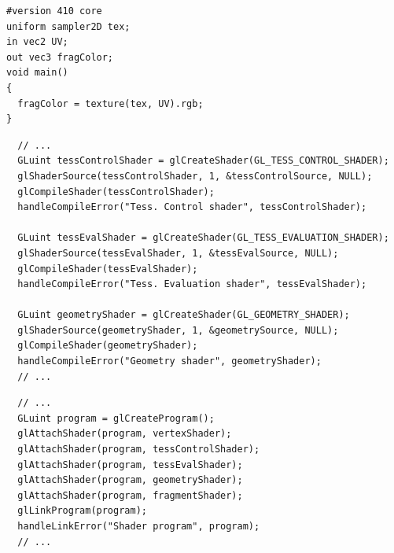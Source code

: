 \documentclass[calcdimensions,landscape,letterpaper]{powersem}
\newcommand{\thecurrentheading}{}
\newcommand{\heading}[1]{\renewcommand{\thecurrentheading}{#1}}
\begin{document}
\begin{slide}
    \heading{Tessellation: Fragment Shader}
    \begin{center}
        \begin{minipage}[c]{.5\textwidth}
            \begin{verbatim}
#version 410 core
uniform sampler2D tex;
in vec2 UV;
out vec3 fragColor;
void main()
{
  fragColor = texture(tex, UV).rgb;
}
            \end{verbatim}
        \end{minipage}
    \end{center}
\end{slide}

\begin{slide}
    \heading{Tessellation: Compile \& Link Shaders}
    \begin{center}
        \begin{minipage}[c]{\textwidth}
            \begin{verbatim}
  // ...
  GLuint tessControlShader = glCreateShader(GL_TESS_CONTROL_SHADER);
  glShaderSource(tessControlShader, 1, &tessControlSource, NULL);
  glCompileShader(tessControlShader);
  handleCompileError("Tess. Control shader", tessControlShader);

  GLuint tessEvalShader = glCreateShader(GL_TESS_EVALUATION_SHADER);
  glShaderSource(tessEvalShader, 1, &tessEvalSource, NULL);
  glCompileShader(tessEvalShader);
  handleCompileError("Tess. Evaluation shader", tessEvalShader);

  GLuint geometryShader = glCreateShader(GL_GEOMETRY_SHADER);
  glShaderSource(geometryShader, 1, &geometrySource, NULL);
  glCompileShader(geometryShader);
  handleCompileError("Geometry shader", geometryShader);
  // ...
            \end{verbatim}
        \end{minipage}
    \end{center}
\end{slide}

\begin{slide}
    \heading{Tessellation: Compile \& Link Shaders}
    \begin{center}
        \begin{minipage}[c]{.95\textwidth}
            \begin{verbatim}
  // ...
  GLuint program = glCreateProgram();
  glAttachShader(program, vertexShader);
  glAttachShader(program, tessControlShader);
  glAttachShader(program, tessEvalShader);
  glAttachShader(program, geometryShader);
  glAttachShader(program, fragmentShader);
  glLinkProgram(program);
  handleLinkError("Shader program", program);
  // ...
            \end{verbatim}
        \end{minipage}
    \end{center}
\end{slide}
\end{document}
